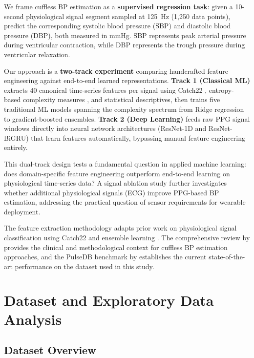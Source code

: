\documentclass[11pt]{article}
\begin{document}
We frame cuffless BP estimation as a \textbf{supervised regression task}: given a 10-second physiological signal segment sampled at 125~Hz (1,250 data points), predict the corresponding systolic blood pressure (SBP) and diastolic blood pressure (DBP), both measured in mmHg. SBP represents peak arterial pressure during ventricular contraction, while DBP represents the trough pressure during ventricular relaxation.

Our approach is a \textbf{two-track experiment} comparing handcrafted feature engineering against end-to-end learned representations. \textbf{Track 1 (Classical ML)} extracts 40 canonical time-series features per signal using Catch22 \citep{lubba2019catch22}, entropy-based complexity measures \citep{bandt2002permutation, rosso2007distinguishing}, and statistical descriptives, then trains five traditional ML models spanning the complexity spectrum from Ridge regression to gradient-boosted ensembles. \textbf{Track 2 (Deep Learning)} feeds raw PPG signal windows directly into neural network architectures (ResNet-1D and ResNet-BiGRU) that learn features automatically, bypassing manual feature engineering entirely.

This dual-track design tests a fundamental question in applied machine learning: does domain-specific feature engineering outperform end-to-end learning on physiological time-series data? A signal ablation study further investigates whether additional physiological signals (ECG) improve PPG-based BP estimation, addressing the practical question of sensor requirements for wearable deployment.

The feature extraction methodology adapts prior work on physiological signal classification using Catch22 and ensemble learning \citep{boda2025ai4pain}. The comprehensive review by \citet{zhao2023cuffless} provides the clinical and methodological context for cuffless BP estimation approaches, and the PulseDB benchmark by \citet{moulaeifard2025pulsedb} establishes the current state-of-the-art performance on the dataset used in this study.

\section{Dataset and Exploratory Data Analysis}

\subsection{Dataset Overview}
\end{document}
